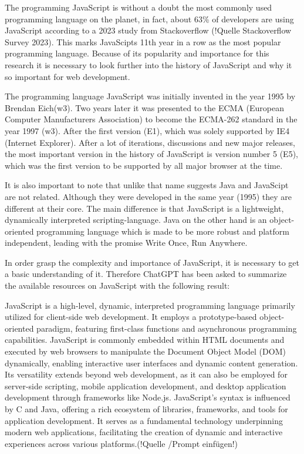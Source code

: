 The programming JavaScript is without a doubt the most commonly used programming language on the planet, in fact, about 63\% of developers are using JavaScript according to a 2023 study from Stackoverflow (!Quelle Stackoverflow Survey 2023). This marks JavaScipts 11th year in a row as the most popular programming language. Because of its popularity and importance for this research it is necessary to look further into the history of JavaScript and why it so important for web development.

The programming language JavaScript was initially invented in the year 1995 by Brendan Eich(w3). Two years later it was presented to the ECMA (European Computer Manufacturers Association) to become the ECMA-262 standard in the year 1997 (w3). After the first version (E1), which was solely supported by IE4 (Internet Explorer).
After a lot of iterations, discussions and new major releases, the most important version in the history of JavaScript is version number 5 (E5), which was the first version to be supported by all major browser at the time.

It is also important to note that unlike that name suggests Java and JavaScipt are not related. Although they were developed in the same year (1995) they are different at their core. The main difference is that JavaScript is a lightweight, dynamically interpreted scripting-language. Java on the other hand is an object-oriented programming language which is made to be more robust and platform independent, leading with the promise \dq Write Once, Run Anywhere\dq .

In order grasp the complexity and importance of JavaScript, it is necessary to get a basic understanding of it. Therefore ChatGPT has been asked to summarize the available resources on JavaScript with the following result:

\dq JavaScript is a high-level, dynamic, interpreted programming language primarily utilized for client-side web development. It employs a prototype-based object-oriented paradigm, featuring first-class functions and asynchronous programming capabilities. JavaScript is commonly embedded within HTML documents and executed by web browsers to manipulate the Document Object Model (DOM) dynamically, enabling interactive user interfaces and dynamic content generation. Its versatility extends beyond web development, as it can also be employed for server-side scripting, mobile application development, and desktop application development through frameworks like Node.js. JavaScript's syntax is influenced by C and Java, offering a rich ecosystem of libraries, frameworks, and tools for application development. It serves as a fundamental technology underpinning modern web applications, facilitating the creation of dynamic and interactive experiences across various platforms.\dq (!Quelle /Prompt einfügen!)

